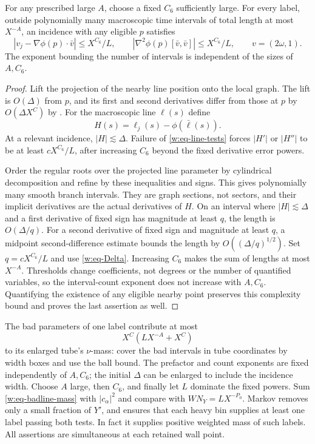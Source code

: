 \begin{lemma}\label{w:line-tests}
For any prescribed large $A$, choose a fixed $C_6$ sufficiently large.
For every label, outside polynomially many macroscopic time intervals
of total length at most $X^{-A}$, an incidence with any eligible $p$
satisfies
\begin{equation}\label{w:eq-line-tests}
 |v_j-\nabla\phi(p)\cdot\bar v|\leq X^{C_6}/L,
 \qquad |\nabla^2\phi(p)[\bar v,\bar v]|\leq X^{C_6}/L,
 \qquad v=(2\omega,1).
\end{equation}
The exponent bounding the number of intervals is independent of the
sizes of $A,C_6$.
\end{lemma}

\begin{proof}
Lift the projection of the nearby line position onto the local graph.
The lift is $O(\Delta)$ from $p$, and its first and second derivatives
differ from those at $p$ by $O(\Delta X^C)$ by
.  For the macroscopic line $\ell(s)$ define
\[
 H(s)=\ell_j(s)-\phi(\bar\ell(s)).
\]
At a relevant incidence, $|H|\lesssim\Delta$.
Failure of \eqref{w:eq-line-tests} forces $|H'|$ or $|H''|$ to be at
least $cX^{C_6}/L$, after increasing $C_6$ beyond the fixed derivative
error powers.

Order the regular roots over the projected line parameter by
cylindrical decomposition and refine by these inequalities and signs.
This gives polynomially many smooth branch intervals.  They are graph
sections, not sectors, and their implicit derivatives are the actual
derivatives of $H$.  On an interval where $|H|\lesssim\Delta$ and a
first derivative of fixed sign has magnitude at least $q$, the length
is $O(\Delta/q)$.  For a second derivative of fixed sign and magnitude
at least $q$, a midpoint second-difference estimate bounds the length
by $O((\Delta/q)^{1/2})$.  Set $q=cX^{C_6}/L$ and use
\eqref{w:eq-Delta}.  Increasing $C_6$ makes the sum of lengths at most
$X^{-A}$.  Thresholds change coefficients, not degrees or the number
of quantified variables, so the interval-count exponent does not
increase with $A,C_6$.  Quantifying the existence of any eligible
nearby point preserves this complexity bound and proves the last
assertion as well.
\end{proof}

The bad parameters of one label contribute at most
\begin{equation}\label{w:eq-badline-mass}
 X^C(LX^{-A}+X^C)
\end{equation}
to its enlarged tube's $\nu$-mass: cover the bad intervals in tube
coordinates by width boxes and use the ball bound.  The prefactor and
count exponents are fixed independently of $A,C_6$; the initial
$\Delta$ can be enlarged to include the incidence width.
Choose $A$ large, then $C_6$, and finally let $L$ dominate the fixed
powers.  Sum \eqref{w:eq-badline-mass} with $|c_\alpha|^2$ and compare
with $WN_Y=LX^{-P_0}$.  Markov removes only a small fraction of $Y'$,
and ensures that each heavy bin supplies at least one label passing
both tests.  In fact it supplies positive weighted mass of such
labels.  All assertions are simultaneous at each retained wall point.

